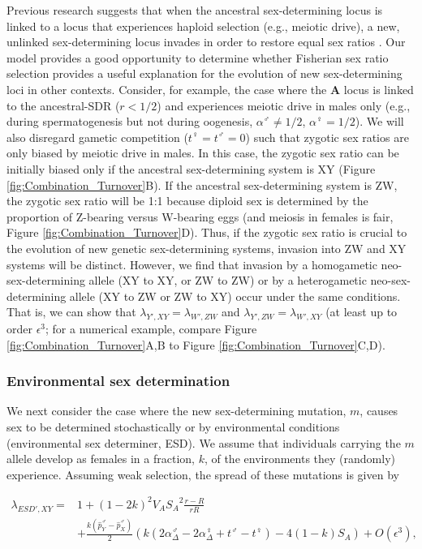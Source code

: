 \documentclass[12pt]{article}
\begin{document}
Previous research suggests that when the ancestral sex-determining locus is linked to a locus that experiences haploid selection (e.g., meiotic drive), a new, unlinked sex-determining locus invades in order to restore equal sex ratios \citep{Kozielska:2010vm}. 
Our model provides a good opportunity to determine whether Fisherian sex ratio selection provides a useful explanation for the evolution of new sex-determining loci in other contexts. 
Consider, for example, the case where the \textbf{A} locus is linked to the ancestral-SDR ($r<1/2$) and experiences meiotic drive in males only (e.g., during spermatogenesis but not during oogenesis, $\alpha^\male \neq 1/2$, $\alpha^\female=1/2$). 
We will also disregard gametic competition ($t^\female=t^\male=0$) such that zygotic sex ratios are only biased by meiotic drive in males. 
In this case, the zygotic sex ratio can be initially biased only if the ancestral sex-determining system is XY (Figure \ref{fig:Combination_Turnover}B). 
If the ancestral sex-determining system is ZW, the zygotic sex ratio will be 1:1 because diploid sex is determined by the proportion of Z-bearing versus W-bearing eggs (and meiosis in females is fair, Figure \ref{fig:Combination_Turnover}D).
Thus, if the zygotic sex ratio is crucial to the evolution of new genetic sex-determining systems, invasion into ZW and XY systems will be distinct. 
However, we find that invasion by a homogametic neo-sex-determining allele (XY to XY, or ZW to ZW) or by a heterogametic neo-sex-determining allele (XY to ZW or ZW to XY) occur under the same conditions. 
That is, we can show that $\lambda_{Y',XY}=\lambda_{W',ZW}$ and $\lambda_{Y',ZW}=\lambda_{W',XY}$ (at least up to order $\epsilon^3$; for a numerical example, compare Figure \ref{fig:Combination_Turnover}A,B to Figure \ref{fig:Combination_Turnover}C,D).

\subsubsection*{Environmental sex determination}

We next consider the case where the new sex-determining mutation, $m$, causes sex to be determined stochastically or by environmental conditions (environmental sex determiner, ESD). 
We assume that individuals carrying the $m$ allele develop as females in a fraction, $k$, of the environments they (randomly) experience. 
Assuming weak selection, the spread of these mutations is given by 

\begin{equation}
\begin{split}
\lambda_{ESD',XY} =& 1 + (1-2k)^2V_{A}{S_{A}}^2\frac{r-R}{r R} \\
&+\frac{k(\hat{p}^\male_Y-\hat{p}^\male_X)}{2}\left(k\left(2\alpha_{\Delta}^\male-2\alpha_{\Delta}^\female+t^\male-t^\female \right) -4(1-k)S_{A}\right)+O\left(\epsilon^3\right),
\end{split}
\label{eq:lambda_ESD_k}
\end{equation}
\end{document}
